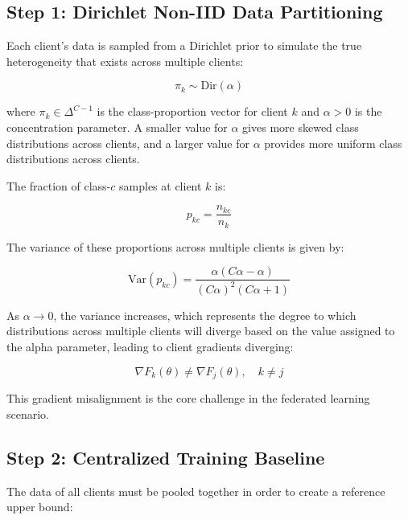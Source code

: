 \documentclass{ieeeaccess}
\begin{document}
\subsection{Step 1: Dirichlet Non-IID Data Partitioning}

Each client's data is sampled from a Dirichlet prior to simulate the true heterogeneity that exists across multiple clients:

\begin{equation}
\label{eq:dirichlet}
\pi_k \sim \text{Dir}(\alpha)
\end{equation}

where $\pi_k \in \Delta^{C-1}$ is the class-proportion vector for client $k$ and $\alpha > 0$ is the concentration parameter. A smaller value for $\alpha$ gives more skewed class distributions across clients, and a larger value for $\alpha$ provides more uniform class distributions across clients.

The fraction of class-$c$ samples at client $k$ is:

\begin{equation}
\label{eq:class_proportion}
p_{kc} = \frac{n_{kc}}{n_k}
\end{equation}

The variance of these proportions across multiple clients is given by:

\begin{equation}
\label{eq:dirichlet_variance}
\text{Var}(p_{kc}) =
\frac{\alpha (C\alpha - \alpha)}
{(C\alpha)^2 (C\alpha + 1)}
\end{equation}

As $\alpha \to 0$, the variance increases, which represents the degree to which distributions across multiple clients will diverge based on the value assigned to the alpha parameter, leading to client gradients diverging:

\begin{equation}
\label{eq:gradient_divergence}
\nabla F_k(\theta) \neq \nabla F_j(\theta), \quad k \neq j
\end{equation}

This gradient misalignment is the core challenge in the federated learning scenario.

\subsection{Step 2: Centralized Training Baseline}

The data of all clients must be pooled together in order to create a reference upper bound:
\end{document}
